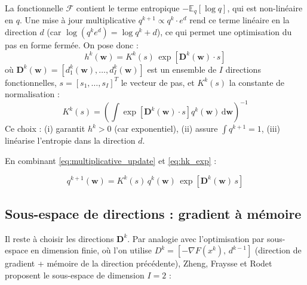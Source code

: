 \documentclass[12pt]{article}
\newcommand{\w}{\boldsymbol{w}}
\begin{document}
\begin{remarkbox}
La fonctionnelle $\mathcal{F}$ contient le terme entropique $-\mathbb{E}_q[\log q]$, qui est non-linéaire en $q$. Une mise à jour multiplicative $q^{k+1} \propto q^k \cdot e^d$ rend ce terme linéaire en la direction $d$ (car $\log(q^k e^d) = \log q^k + d$), ce qui permet une optimisation du pas en forme fermée. On pose donc :
\begin{equation}
    h^k(\w) = K^k(s)\, \exp\!\left[\boldsymbol{D}^k(\w) \cdot s\right]
    \label{eq:hk_exp}
\end{equation}
où $\boldsymbol{D}^k(\w) = [d_1^k(\w), \ldots, d_I^k(\w)]$ est un ensemble de $I$ directions fonctionnelles, $s = [s_1, \ldots, s_I]^T$ le vecteur de pas, et $K^k(s)$ la constante de normalisation :
\[
K^k(s) = \left(\int \exp\!\left[\boldsymbol{D}^k(\w) \cdot s\right] q^k(\w)\, \mathrm{d}\w\right)^{-1}
\]
Ce choix : (i) garantit $h^k > 0$ (car exponentiel), (ii) assure $\int q^{k+1} = 1$, (iii) linéarise l'entropie dans la direction $d$.
\end{remarkbox}

En combinant \eqref{eq:multiplicative_update} et \eqref{eq:hk_exp} 
:

\begin{resultbox}
\label{res:update_emgvba}
\begin{equation}
    \boxed{q^{k+1}(\w) = K^k(s)\, q^k(\w)\, \exp\!\left[\boldsymbol{D}^k(\w)\, s\right]}
    \label{eq:update_emgvba}
\end{equation}
\end{resultbox}


\subsection{Sous-espace de directions 
: gradient à mémoire}

Il reste à choisir les directions $\boldsymbol{D}^k$. Par analogie avec l'optimisation par sous-espace en dimension finie, où l'on utilise $D^k = [-\nabla F(x^k),\, d^{k-1}]$ (direction de gradient + mémoire de la direction précédente), Zheng, Fraysse et Rodet 
\cite{rodet} proposent le sous-espace de dimension $I = 2$ 
:
\end{document}
